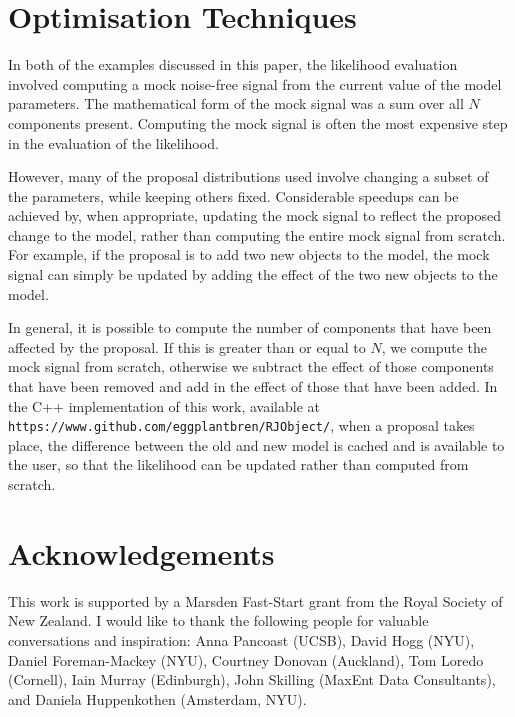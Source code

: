 \documentclass[letterpaper, 11pt]{article}
\begin{document}

\section{Optimisation Techniques}\label{sec:optimisation}
In both of the examples discussed in this paper, the likelihood evaluation
involved computing a mock noise-free signal from the current value of the
model parameters. The mathematical form of the mock signal was a sum over
all $N$ components present. Computing the mock signal is often the most
expensive step in the evaluation of the likelihood.

However, many of the proposal distributions used involve changing a subset
of the parameters, while keeping others fixed. Considerable speedups can be
achieved by, when appropriate, updating the mock signal to reflect the proposed
change to the model, rather than computing the entire mock signal from scratch.
For example, if the proposal is to add two new objects to the model, the
mock signal can simply be updated by adding the effect of the two new objects
to the model.

In general, it is possible to compute the number of components that have been
affected by the proposal. If this is greater than or equal to $N$, we compute
the mock signal from scratch, otherwise we subtract the effect of those
components that have been removed and add in the effect of those that have been
added. In the C++ implementation of this work, available at
{\tt https://www.github.com/eggplantbren/RJObject/}, when a proposal takes
place, the difference between the old and new model is cached and is available
to the user, so that the likelihood can be updated rather than computed
from scratch.

\section*{Acknowledgements}
This work is supported by a Marsden Fast-Start grant
from the Royal Society of New Zealand. I would like to thank the following
people for valuable conversations and inspiration:
Anna Pancoast (UCSB), David Hogg (NYU), Daniel Foreman-Mackey (NYU),
Courtney Donovan (Auckland), Tom Loredo (Cornell), Iain Murray (Edinburgh),
John Skilling (MaxEnt Data Consultants), and Daniela Huppenkothen
(Amsterdam, NYU).
\end{document}
